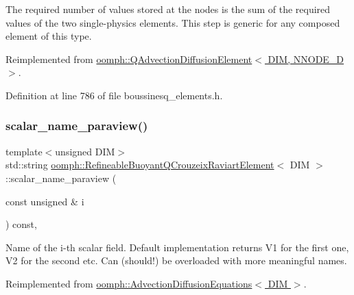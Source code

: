 The required number of values stored at the nodes is the sum of the required values of the two single-\/physics elements. This step is generic for any composed element of this type. 



Reimplemented from \hyperlink{classoomph_1_1QAdvectionDiffusionElement_a5add10bf35486c4ece4505a067cc2fd2}{oomph\+::\+Q\+Advection\+Diffusion\+Element$<$ D\+I\+M, N\+N\+O\+D\+E\+\_\+D $>$}.



Definition at line 786 of file boussinesq\+\_\+elements.\+h.

\mbox{\label{classoomph_1_1RefineableBuoyantQCrouzeixRaviartElement_ae9b9687a5a15a0089431ad1b143356e5}} 
\subsubsection{\texorpdfstring{scalar\+\_\+name\+\_\+paraview()}{scalar\_name\_paraview()}}
{\footnotesize\ttfamily template$<$unsigned D\+IM$>$ \\
std\+::string \hyperlink{classoomph_1_1RefineableBuoyantQCrouzeixRaviartElement}{oomph\+::\+Refineable\+Buoyant\+Q\+Crouzeix\+Raviart\+Element}$<$ D\+IM $>$\+::scalar\+\_\+name\+\_\+paraview (\begin{DoxyParamCaption}\item[{const unsigned \&}]{i }\end{DoxyParamCaption}) const\hspace{0.3cm}{\ttfamily [inline]}, {\ttfamily [virtual]}}



Name of the i-\/th scalar field. Default implementation returns V1 for the first one, V2 for the second etc. Can (should!) be overloaded with more meaningful names. 



Reimplemented from \hyperlink{classoomph_1_1AdvectionDiffusionEquations_a37c30bb64389d12ffef51f046d846886}{oomph\+::\+Advection\+Diffusion\+Equations$<$ D\+I\+M $>$}.



